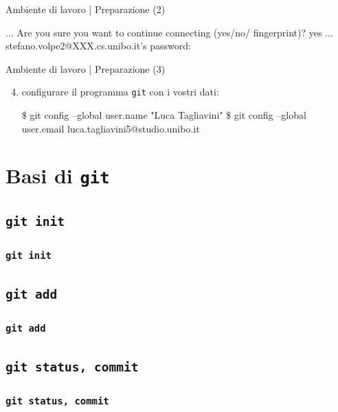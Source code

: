 \documentclass{beamer}
\begin{document}
\begin{frame}{Ambiente di lavoro | Preparazione (2)}
  \begin{semiverbatim}
  \lbrack ...\rbrack \newline
  Are you sure you want to continue connecting \newline (yes/no/\lbrack
  fingerprint\rbrack)? yes \newline
  \lbrack ...\rbrack \newline
  stefano.volpe2@XXX.cs.unibo.it's password:
  \end{semiverbatim}
\end{frame}

\begin{frame}{Ambiente di lavoro | Preparazione (3)}
  \begin{enumerate}
    \setcounter{enumi}{3}
    \item configurare il programma \texttt{git} con i vostri dati:
    \begin{semiverbatim}
    \$ git config --global user.name "Luca Tagliavini"
    \$ git config --global user.email luca.tagliavini5@studio.unibo.it
    \end{semiverbatim}
  \end{enumerate}
\end{frame}

\section{Basi di \texttt{git}}

\subsection{\texttt{git init}}
\begin{frame}
  \frametitle{\texttt{git init}}
\end{frame}

\subsection{\texttt{git add}}
\begin{frame}
  \frametitle{\texttt{git add}}
\end{frame}

\subsection{\texttt{git status, commit}}
\begin{frame}
  \frametitle{\texttt{git status, commit}}
\end{frame}
\end{document}
